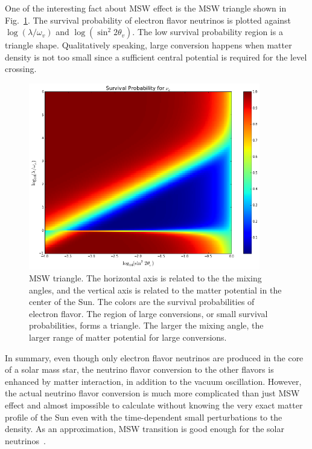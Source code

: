 One of the interesting fact about MSW effect is the MSW triangle shown in Fig.~\ref{chap:basics-sec:msw-fig:msw-triangle}. The survival probability of electron flavor neutrinos is plotted against $\log (\lambda/\omega_v)$ and $\log (\sin^2 2\theta_v)$. The low survival probability region is a triangle shape. Qualitatively speaking, large conversion happens when matter density is not too small since a sufficient central potential is required for the level crossing. 
\begin{figure}
    \centering
    \includegraphics[width=0.9\textwidth]{chapters/assets/basics/msw-triangle.png}
    \caption{MSW triangle. The horizontal axis is related to the the mixing angles, and the vertical axis is related to the matter potential in the center of the Sun. The colors are the survival probabilities of electron flavor. The region of large conversions, or small survival probabilities, forms a triangle. The larger the mixing angle, the larger range of matter potential for large conversions.}
    \label{chap:basics-sec:msw-fig:msw-triangle}
\end{figure}


In summary, even though only electron flavor neutrinos are produced in the core of a solar mass star, the neutrino flavor conversion to the other flavors is enhanced by matter interaction, in addition to the vacuum oscillation. However, the actual neutrino flavor conversion is much more complicated than just MSW effect and almost impossible to calculate without knowing the very exact matter profile of the Sun even with the time-dependent small perturbations to the density. As an approximation, MSW transition is good enough for the solar neutrinos~\cite{Lopes2013a}.


